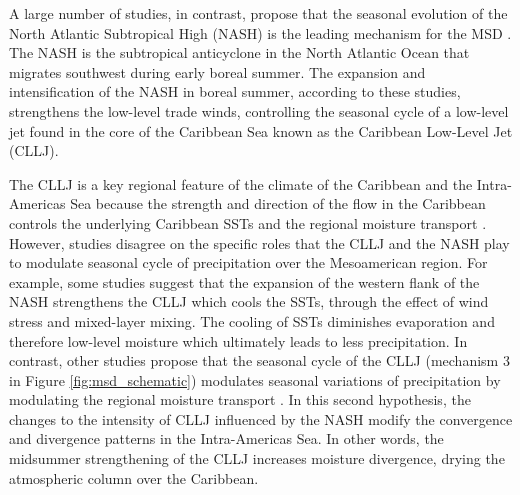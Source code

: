 A large number of studies, in contrast, propose that the seasonal evolution of the North Atlantic Subtropical High (NASH) is the leading mechanism for the MSD \citep[e.g.][]{mapes2005,small2007,gamble2008,curtis2008,munoz2008,martinez2019,corrales2020}. The NASH is the subtropical anticyclone in the North Atlantic Ocean that migrates southwest during early boreal summer. The expansion and intensification of the NASH in boreal summer, according to these studies, strengthens the low-level trade winds, controlling the seasonal cycle of a low-level jet found in the core of the Caribbean Sea known as the Caribbean Low-Level Jet (CLLJ). 

The CLLJ is a key regional feature of the climate of the Caribbean and the Intra-Americas Sea  because the strength and direction of the flow in the Caribbean controls the underlying Caribbean SSTs and the regional moisture transport \citep{giannini2000,mestas2007,martinez2019,garcia2020sub}. 
 However, studies disagree on the specific roles that the CLLJ and the NASH play to modulate seasonal cycle of precipitation over the Mesoamerican region. 
 For example, some studies \citep[e.g.][]{giannini2000,mestas2007,gamble2008} suggest that  the expansion of the western flank of the NASH strengthens the CLLJ which cools the SSTs, through the effect of wind stress and mixed-layer mixing.
The cooling of SSTs diminishes evaporation and therefore low-level moisture which ultimately leads to less precipitation. In contrast, other studies propose that the seasonal cycle of the CLLJ (mechanism 3 in Figure \ref{fig:msd_schematic}) modulates seasonal variations of precipitation by modulating the regional moisture transport  \citep{small2007,munoz2008,herrera2015,duranquesada2017,martinez2019}. In this second hypothesis, the changes to the intensity of CLLJ influenced by the NASH modify the convergence and divergence patterns in the Intra-Americas Sea. In other words, the midsummer strengthening of the CLLJ increases moisture divergence, drying the atmospheric column over the Caribbean. 


 
    


